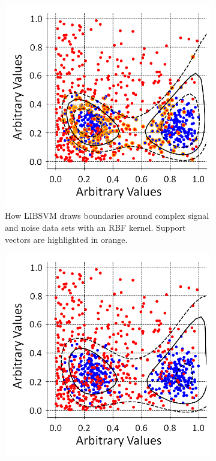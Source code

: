 \begin{figure}[!h]
\centering
\begin{subfigure}{.5\textwidth}
  \centering
  \includegraphics[width=\linewidth]{Chapter4/Figs/adjustedSvmPlots/adjusted_exp_2GaussExample.png}
  \captionsetup{width=.9\linewidth}
  \caption{How LIBSVM draws boundaries around complex signal and noise data sets with an RBF kernel. Support vectors are highlighted in orange.}
  \label{subFig:svmExp_2GausseExample}
\end{subfigure}%
\begin{subfigure}{.5\textwidth}
  \centering
  \includegraphics[width=\linewidth]{Chapter4/Figs/adjustedSvmPlots/adjusted_exp_2NysGaussExample.png}

\end{subfigure}
\end{figure}
